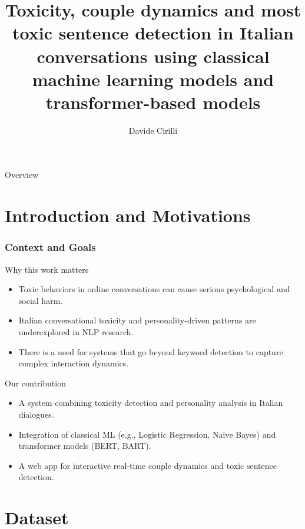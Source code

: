 \documentclass[aspectratio=169,xcolor=dvipsnames]{beamer}
\title{Toxicity, couple dynamics and most toxic sentence detection in Italian conversations using classical machine learning models and transformer-based models}
\subtitle{} %
\author{Davide Cirilli}
\institute
{
    Università degli Studi di Bari Aldo Moro
}
\date{} %
\begin{document}
\begin{frame}
    \titlepage
\end{frame}

\begin{frame}{Overview}
    \tableofcontents
\end{frame}

\section{Introduction and Motivations}

\begin{frame}
\frametitle{Context and Goals}

\begin{block}{Why this work matters}
\begin{itemize}
\item Toxic behaviors in online conversations can cause serious psychological and social harm.
\item Italian conversational toxicity and personality-driven patterns are underexplored in NLP research.
\item There is a need for systems that go beyond keyword detection to capture complex interaction dynamics.
\end{itemize}
\end{block}

\begin{block}{Our contribution}
\begin{itemize}
\item A system combining toxicity detection and personality analysis in Italian dialogues.
\item Integration of classical ML (e.g., Logistic Regression, Naive Bayes) and transformer models (BERT, BART).
\item A web app for interactive real-time couple dynamics and toxic sentence detection.
\end{itemize}
\end{block}

\end{frame}

\section{Dataset}
\end{document}
